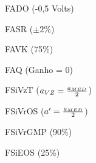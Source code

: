 \begin{figure}[htb]
\footnotesize
\centering

\vspace{1cm}
\caption{FADO (-0,5 Volts)}
\label{fig:fado}
\end{figure}

\begin{figure}[htb]
\footnotesize
\centering

\vspace{1cm}
\caption{FASR ($\pm 2\%$)}
\label{fig:fasr}
\end{figure}

\begin{figure}[htb]
\footnotesize
\centering

\vspace{1cm}
\caption{FAVK (75\%)}
\label{fig:favk}
\end{figure}

\begin{figure}[htb]
\footnotesize
\centering

\vspace{1cm}
\caption{FAQ (Ganho = 0)}
\label{fig:faq}
\end{figure}

\begin{figure}[htb]
\footnotesize
\centering

\vspace{1cm}
\caption{FSiVzT ($a_{\tiny VZ} = \frac{a_{\tiny MED}}{2}$)}
\label{fig:fsivzt}
\end{figure}

\begin{figure}[htb]
\footnotesize
\centering

\vspace{1cm}
\caption{FSiVrOS ($a' = \frac{a_{\tiny MED}}{2}$)}
\label{fig:fsivros}
\end{figure}

\begin{figure}[htb]
\footnotesize
\centering

\vspace{1cm}
\caption{FSiVrGMP (90\%)}
\label{fig:fsivrgmp}
\end{figure}

\begin{figure}[htb]
\footnotesize
\centering

\vspace{1cm}
\caption{FSiEOS (25\%)}
\label{fig:fsieos}
\end{figure}

